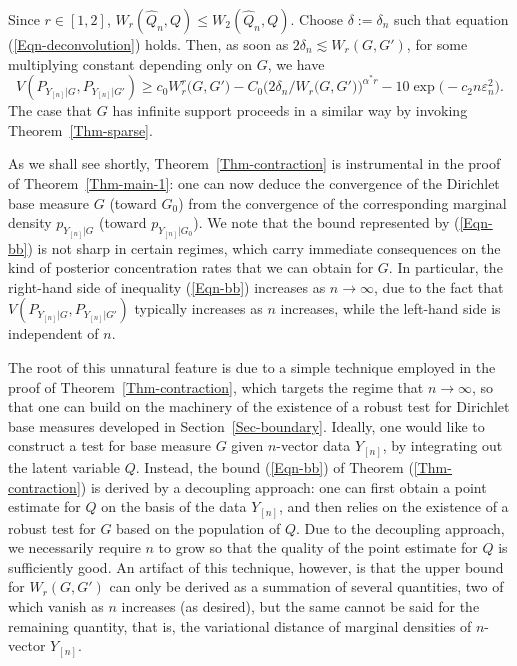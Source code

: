 \documentclass[MSNbibl,number,citesort]{arxbj}
\newcommand{\eqref}[1]{(\ref{#1})}
\def\comment{}
\newcommand{\Pcal}{\mathscr{P}}
\newcommand{\Prob}{\mathbb{P}}
\newcommand{\Wr}{W_r}
\newcommand{\hatQ}{\hat{Q}}
\newcommand{\PG}{P_{Y_{[n]}|G}}
\newcommand{\YYn}{Y_{[n]}}
\begin{document}
\begin{pf}
Since $r\in[1,2]$, $\Wr(\hatQ_n,Q) \leq W_2(\hatQ_n,Q)$.
Choose $\delta:= \delta_n$ such that equation \eqref
{Eqn-deconvolution} holds.
Then, as soon as $2\delta_n \lesssim\Wr(G,G')$, for some multiplying
constant depending only on $G$, we have
%
\[
V(\PG,P_{Y_{[n]}|G'}) \geq c_0\Wr^r
\bigl(G,G' \bigr) - C_0 \bigl(2\delta_n/ \Wr
\bigl(G,G' \bigr) \bigr)^{{\alpha^*}r}- 10\exp
\bigl(-c_2 n\varepsilon_n^2 \bigr).
\]
%
The case that $G$ has infinite support
proceeds in a similar way by invoking Theorem~\ref{Thm-sparse}.
%
\end{pf}

\begin{remark*}
As we shall see shortly, Theorem~\ref{Thm-contraction}
is instrumental in the proof of Theorem~\ref{Thm-main-1}:
one can now deduce the convergence of the Dirichlet
base measure $G$ (toward $G_0$) from the convergence of the corresponding
marginal density ${p_{Y_{[n]}|G}}$ (toward $
{p_{Y_{[n]}|G_0}}$). We note that
the bound represented by \eqref{Eqn-bb} is not sharp in certain regimes,
which carry immediate consequences on
the kind of posterior concentration rates that we can obtain for $G$.
In particular, the right-hand side of inequality \eqref{Eqn-bb}
increases as $n \rightarrow\infty$, due to the fact that
$V(\PG,P_{Y_{[n]}|G'})$ typically increases as $n$ increases, while
the left-hand
side is independent of $n$.

The root of this unnatural feature is due to a simple
technique employed in the proof of Theorem~\ref{Thm-contraction},
which targets the regime that $n\rightarrow\infty$, so that one
can build on the machinery of the existence of a robust test
for Dirichlet base measures developed in Section~\ref{Sec-boundary}.
Ideally, one would like to construct
a test for base measure $G$ given $n$-vector data
$\YYn$, by integrating out the latent variable $Q$. Instead, the
bound \eqref{Eqn-bb} of Theorem \eqref{Thm-contraction} is derived by
a decoupling approach: one can first obtain a point estimate
for $Q$ on the basis of the data $\YYn$, and then relies on
the existence of a robust
test for $G$ based on the population of $Q$. Due to
the decoupling approach, we necessarily require $n$ to
grow so that the quality of the point estimate for $Q$ is
sufficiently good. An artifact of this technique, however,
is that the upper bound for $\Wr(G,G')$ can only be
derived as a summation of several quantities, two of which vanish
as $n$ increases (as desired), but the same cannot be said for the
remaining quantity, that is,
the variational distance of marginal densities of
$n$-vector $\YYn$.
\end{remark*}
\end{document}
